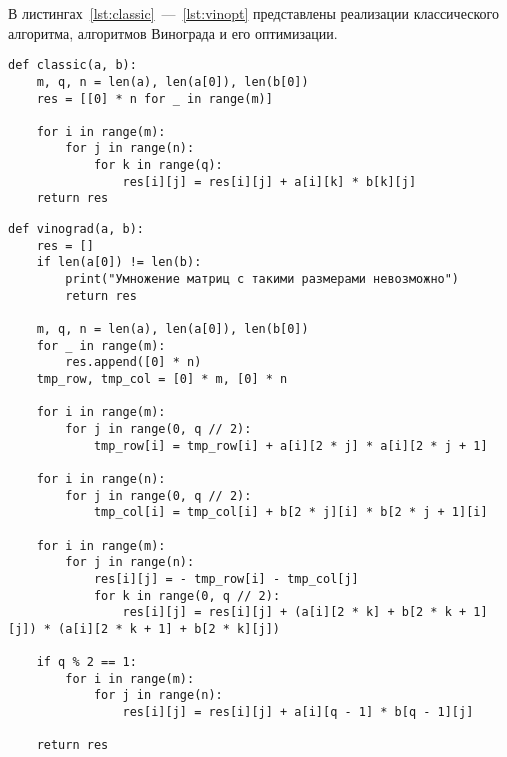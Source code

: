 В листингах~\ref{lst:classic}~---~\ref{lst:vinopt} представлены реализации классического алгоритма, алгоритмов Винограда и его оптимизации.

\begin{center}
	\captionsetup{justification=raggedright,singlelinecheck=off}
	\begin{lstlisting}[label=lst:classic,caption=Классический алгоритм]
def classic(a, b):
	m, q, n = len(a), len(a[0]), len(b[0])
	res = [[0] * n for _ in range(m)]
	
	for i in range(m):
		for j in range(n):
			for k in range(q):
				res[i][j] = res[i][j] + a[i][k] * b[k][j]
	return res
	\end{lstlisting}
\end{center}

\begin{center}
	\captionsetup{justification=raggedright,singlelinecheck=off}
	\begin{lstlisting}[label=lst:vin,caption=Алгоритм Винограда]
def vinograd(a, b):
	res = []
	if len(a[0]) != len(b):
		print("Умножение матриц с такими размерами невозможно")
		return res
	
	m, q, n = len(a), len(a[0]), len(b[0])
	for _ in range(m):
		res.append([0] * n)
	tmp_row, tmp_col = [0] * m, [0] * n
	
	for i in range(m):
		for j in range(0, q // 2):
			tmp_row[i] = tmp_row[i] + a[i][2 * j] * a[i][2 * j + 1]
	
	for i in range(n):
		for j in range(0, q // 2):
			tmp_col[i] = tmp_col[i] + b[2 * j][i] * b[2 * j + 1][i]
	
	for i in range(m):
		for j in range(n):
			res[i][j] = - tmp_row[i] - tmp_col[j]
			for k in range(0, q // 2):
				res[i][j] = res[i][j] + (a[i][2 * k] + b[2 * k + 1][j]) * (a[i][2 * k + 1] + b[2 * k][j])
	
	if q % 2 == 1:
		for i in range(m):
			for j in range(n):
				res[i][j] = res[i][j] + a[i][q - 1] * b[q - 1][j]
	
	return res
	\end{lstlisting}
\end{center}

